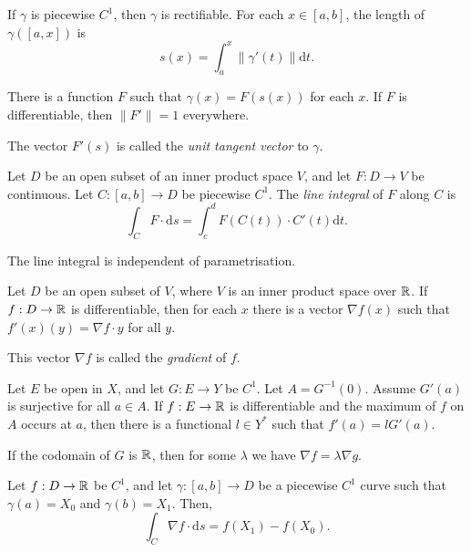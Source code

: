\begin{prop}
    If $\gamma$ is piecewise $C^1$, then $\gamma$ is rectifiable. For each
    $x\in[a,b]$, the length of $\gamma([a,x])$ is
    \[s(x)=\int_a^x\|\gamma'(t)\|\mathrm dt.\]
\end{prop}
\begin{prop}
    There is a function $F$
    such that $\gamma(x)=F(s(x))$ for each $x$. If $F$ is differentiable, then
    $\|F'\|=1$ everywhere.
\end{prop}
\begin{defn}
    The vector $F'(s)$ is called the \emph{unit tangent vector} to $\gamma$.
\end{defn}
\begin{defn}
    Let $D$ be an open subset of an inner product space $V$, and let $F:D\to V$
    be continuous. Let $C:[a,b]\to D$ be piecewise $C^1$.
    The \emph{line integral} of $F$ along $C$ is
    \[\int_C F\cdot\mathrm ds=\int_c^d F(C(t))\cdot C'(t)\mathrm dt.\]
\end{defn}
\begin{prop}
    The line integral is independent of parametrisation.
\end{prop}
\begin{prop}
    Let $D$ be an open subset of $V$, where $V$ is an inner product space over $\mathbb{R}$.
    If $f:D\to\mathbb{R}$ is differentiable, then for each $x$ there is a vector $\nabla f(x)$ such
    that $f'(x)(y)=\nabla f\cdot y$ for all $y$.
\end{prop}
\begin{defn}
    This vector $\nabla f$ is called the \emph{gradient} of $f$.
\end{defn}
\begin{prop}
    Let $E$ be open in $X$, and let $G:E\to Y$ be $C^1$. Let $A=G^{-1}(0)$.
    Assume $G'(a)$ is surjective for all $a\in A$.
    If $f:E\to\mathbb{R}$ is differentiable and the maximum of $f$ on $A$ occurs at $a$,
    then there is a functional $l\in Y^*$ such that $f'(a)=lG'(a)$.
\end{prop}
\begin{cor}
    If the codomain of $G$ is $\mathbb{R}$,
    then for some $\lambda$ we have $\nabla f=\lambda\nabla g$.
\end{cor}
\begin{thm}
    Let $f:D\to\mathbb{R}$ be $C^1$, and let $\gamma:[a,b]\to D$ be a piecewise $C^1$
    curve such that $\gamma(a)=X_0$ and $\gamma(b)=X_1$. Then,
    \[\int_C\nabla f\cdot\mathrm ds=f(X_1)-f(X_0).\]
\end{thm}
